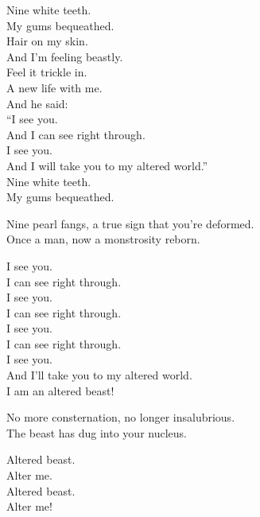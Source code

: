 Nine white teeth. \\
My gums bequeathed. \\

Hair on my skin. \\
And I'm feeling beastly. \\
Feel it trickle in. \\
A new life with me. \\

And he said: \\
``I see you. \\
And I can see right through. \\
I see you. \\
And I will take you to my altered world.'' \\

Nine white teeth. \\
My gums bequeathed. \\


Nine pearl fangs, a true sign that you're deformed. \\
Once a man, now a monstrosity reborn. \\


I see you. \\
I can see right through. \\
I see you. \\
I can see right through. \\
I see you. \\
I can see right through. \\
I see you. \\
And I'll take you to my altered world. \\

I am an altered beast! \\





No more consternation, no longer insalubrious. \\
The beast  has dug into your nucleus. \\


Altered beast. \\
Alter me. \\
Altered beast. \\
Alter me! \\

